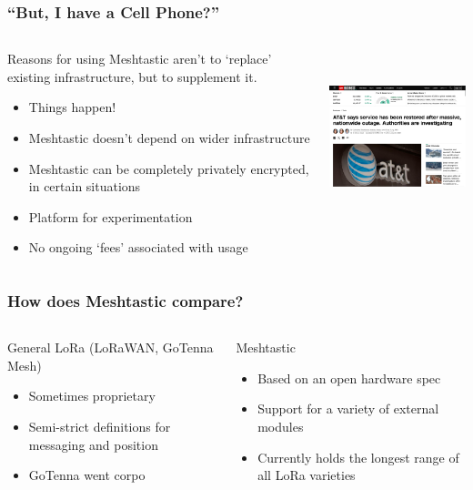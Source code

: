 \documentclass[aspectratio=169]{beamer}
\begin{document}
\begin{frame}[fragile]
  \frametitle{``But, I have a Cell Phone?''}
  \begin{columns}[]
    \begin{column}[T]{0.45\paperwidth}
      Reasons for using Meshtastic aren't to `replace' existing infrastructure, but to supplement it.
      \begin{itemize}%
        \item{Things happen!}
        \item{Meshtastic doesn't depend on wider infrastructure}
        \item{Meshtastic can be completely privately encrypted, in certain situations}
        \item{Platform for experimentation}
        \item{No ongoing `fees' associated with usage}
     \end{itemize}
    \end{column}
    \begin{column}[T]{0.45\paperwidth}
      \includegraphics[height=5cm,keepaspectratio]{images/att.png}
    \end{column}
  \end{columns}
\end{frame}

\begin{frame}[fragile]
  \frametitle{How does Meshtastic compare?}
  \begin{columns}[]
    \begin{column}[T]{0.45\paperwidth}
      \Large{General LoRa (LoRaWAN, GoTenna Mesh)}
      \begin{itemize}
        \item{Sometimes proprietary}
        \item{Semi-strict definitions for messaging and position}
        \item{GoTenna went corpo}
      \end{itemize}
    \end{column}
    \begin{column}[T]{0.45\paperwidth}
      \Large{Meshtastic}
      \begin{itemize}
        \item{Based on an open hardware spec}
        \item{Support for a variety of external modules}
        \item{Currently holds the longest range of all LoRa varieties}
      \end{itemize}
    \end{column}
  \end{columns}
\end{frame}
\end{document}
